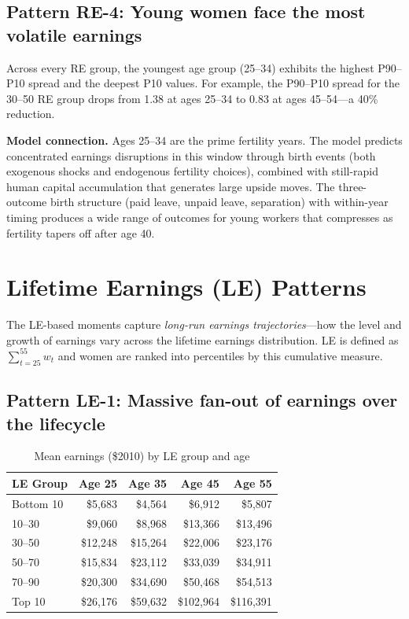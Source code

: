 \documentclass[11pt]{article}
\begin{document}
\subsection{Pattern RE-4: Young women face the most volatile earnings}

Across every RE group, the youngest age group (25--34) exhibits the highest P90--P10 spread and the deepest P10 values. For example, the P90--P10 spread for the 30--50 RE group drops from 1.38 at ages 25--34 to 0.83 at ages 45--54---a 40\% reduction.

\medskip\noindent\textbf{Model connection.} Ages 25--34 are the prime fertility years. The model predicts concentrated earnings disruptions in this window through birth events (both exogenous shocks and endogenous fertility choices), combined with still-rapid human capital accumulation that generates large upside moves. The three-outcome birth structure (paid leave, unpaid leave, separation) with within-year timing produces a wide range of outcomes for young workers that compresses as fertility tapers off after age 40.

\section{Lifetime Earnings (LE) Patterns}

The LE-based moments capture \emph{long-run earnings trajectories}---how the level and growth of earnings vary across the lifetime earnings distribution. LE is defined as $\sum_{t=25}^{55} w_t$ and women are ranked into percentiles by this cumulative measure.

\subsection{Pattern LE-1: Massive fan-out of earnings over the lifecycle}

\begin{table}[h]\centering
\caption{Mean earnings (\$2010) by LE group and age}
\begin{tabular}{lrrrr}
\toprule
LE Group & Age 25 & Age 35 & Age 45 & Age 55 \\
\midrule
Bottom 10 & \$5,683  & \$4,564  & \$6,912   & \$5,807 \\
10--30    & \$9,060  & \$8,968  & \$13,366  & \$13,496 \\
30--50    & \$12,248 & \$15,264 & \$22,006  & \$23,176 \\
50--70    & \$15,834 & \$23,112 & \$33,039  & \$34,911 \\
70--90    & \$20,300 & \$34,690 & \$50,468  & \$54,513 \\
Top 10    & \$26,176 & \$59,632 & \$102,964 & \$116,391 \\
\bottomrule
\end{tabular}
\end{table}
\end{document}
